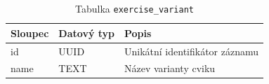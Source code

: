\begin{table}[ht!]
    \centering
    \begin{tabularx}{\textwidth}{|l|l|L|}
        \hline
        \textbf{Sloupec} & \textbf{Datový typ} & \textbf{Popis}                 \\ \hline
        id               & UUID                & Unikátní identifikátor záznamu \\ \hline
        name             & TEXT                & Název varianty cviku           \\ \hline
    \end{tabularx}
    \caption{Tabulka \texttt{exercise\_variant}}
    \label{tab:exercise_variant}
\end{table}
